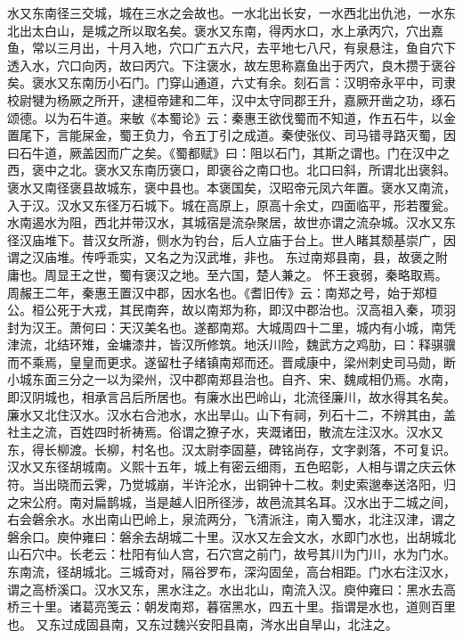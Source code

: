 \documentclass[12pt,UTF8]{ctexbook}
\begin{document}
水又东南径三交城，城在三水之会故也。一水北出长安，一水西北出仇池，一水东北出太白山，是城之所以取名矣。褒水又东南，得丙水口，水上承丙穴，穴出嘉鱼，常以三月出，十月入地，穴口广五六尺，去平地七八尺，有泉悬注，鱼自穴下透入水，穴口向丙，故曰丙穴。下注褒水，故左思称嘉鱼出于丙穴，良木攒于褒谷矣。褒水又东南历小石门。门穿山通道，六丈有余。刻石言：汉明帝永平中，司隶校尉犍为杨厥之所开，逮桓帝建和二年，汉中太守同郡王升，嘉厥开凿之功，琢石颂德。以为石牛道。来敏《本蜀论》云：秦惠王欲伐蜀而不知道，作五石牛，以金置尾下，言能屎金，蜀王负力，令五丁引之成道。秦使张仪、司马错寻路灭蜀，因曰石牛道，厥盖因而广之矣。《蜀都赋》曰：阻以石门，其斯之谓也。门在汉中之西，褒中之北。褒水又东南历褒口，即褒谷之南口也。北口曰斜，所谓北出褒斜。褒水又南径褒县故城东，褒中县也。本褒国矣，汉昭帝元凤六年置。褒水又南流，入于汉。汉水又东径万石城下。城在高原上，原高十余丈，四面临平，形若覆瓮。水南遏水为阻，西北并带汉水，其城宿是流杂聚居，故世亦谓之流杂城。汉水又东径汉庙堆下。昔汉女所游，侧水为钓台，后人立庙于台上。世人睹其颓基崇广，因谓之汉庙堆。传呼乖实，又名之为汉武堆，非也。
东过南郑县南，县，故褒之附庸也。周显王之世，蜀有褒汉之地。至六国，楚人兼之。
怀王衰弱，秦略取焉。周赧王二年，秦惠王置汉中郡，因水名也。《耆旧传》云：南郑之号，始于郑桓公。桓公死于大戎，其民南奔，故以南郑为称，即汉中郡治也。汉高祖入秦，项羽封为汉王。萧何曰：天汉美名也。遂都南郑。大城周四十二里，城内有小城，南凭津流，北结环雉，金墉漆井，皆汉所修筑。地沃川险，魏武方之鸡肋，曰：释骐骥而不乘焉，皇皇而更求。遂留杜子绪镇南郑而还。晋咸康中，梁州刺史司马勋，断小城东面三分之一以为梁州，汉中郡南郑县治也。自齐、宋、魏咸相仍焉。水南，即汉阴城也，相承言吕后所居也。有廉水出巴岭山，北流径廉川，故水得其名矣。廉水又北住汉水。汉水右合池水，水出旱山。山下有祠，列石十二，不辨其由，盖社主之流，百姓四时祈祷焉。俗谓之獠子水，夹溉诸田，散流左注汉水。汉水又东，得长柳渡。长柳，村名也。汉太尉李固墓，碑铭尚存，文字剥落，不可复识。汉水又东径胡城南。义熙十五年，城上有密云细雨，五色昭彰，人相与谓之庆云休符。当出晓而云霁，乃觉城崩，半许沦水，出铜钟十二枚。刺史索邈奉送洛阳，归之宋公府。南对扁鹊城，当是越人旧所径涉，故邑流其名耳。汉水出于二城之间，右会磐余水。水出南山巴岭上，泉流两分，飞清派注，南入蜀水，北注汉津，谓之磐余口。庾仲雍曰：磐余去胡城二十里。汉水又左会文水，水即门水也，出胡城北山石穴中。长老云：杜阳有仙人宫，石穴宫之前门，故号其川为门川，水为门水。东南流，径胡城北。三城奇对，隔谷罗布，深沟固垒，高台相距。门水右注汉水，谓之高桥溪口。汉水又东，黑水注之。水出北山，南流入汉。庾仲雍曰：黑水去高桥三十里。诸葛亮笺云：朝发南郑，暮宿黑水，四五十里。指谓是水也，道则百里也。
又东过成固县南，又东过魏兴安阳县南，涔水出自旱山，北注之。
\end{document}
